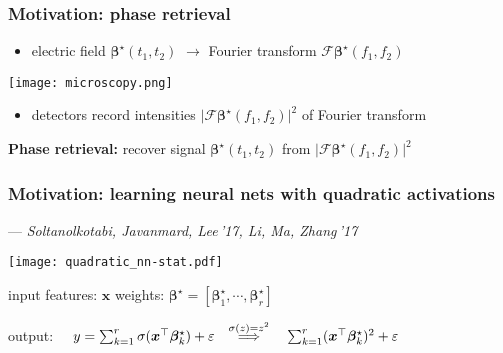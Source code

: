 \documentclass[compress,
mathserif,wide,%
]{beamer}
\begin{document}
\begin{frame}
  \frametitle{Motivation: phase retrieval}



  \begin{itemize}
	\item electric field $\bm{\beta}^\star(t_1, t_2)$  $\longrightarrow$ Fourier transform $\mathcal{F}\bm{\beta}^\star(f_1, f_2)$
  \end{itemize}
  \vfill
\begin{center}
\texttt{[image: microscopy.png]} 
\end{center}

\begin{itemize}
	\item detectors record \alert{intensities} $\big| \mathcal{F}\bm{\beta}^\star(f_1, f_2) \big|^2 $ of Fourier transform
  \end{itemize}
  

\pause


\vfill
{

\begin{varblock}[\textwidth]{}
\begin{center}
   {\bf Phase retrieval:}  recover signal $\bm{\beta}^{\star}(t_{1},t_{2})$ from $| \mathcal{F}\bm{\beta}^\star(f_1, f_2) \big|^2$
\end{center}
\end{varblock}
}
\end{frame}




\begin{frame}
	\frametitle{Motivation: learning neural nets with quadratic activations}

	\hfill --- {\footnotesize \em Soltanolkotabi, Javanmard, Lee\,'17,  Li, Ma, Zhang\,'17}

\begin{center}
\texttt{[image: quadratic\_nn-stat.pdf]}
\end{center}

\vspace{-0.5em}
input features: $\bm{x}$ \quad weights: $\bm{\beta}^{\star}=[\bm{\beta}_1^{\star},\cdots,\bm{\beta}_r^{\star}]$

\vspace{0.3em}
output: $\quad	y  = \sum_{k=1}^r \sigma(\bm{x}^{\top}\bm{\beta}_k^{\star})  + \varepsilon {\quad \stackrel{\sigma(z)=z^2}{\Longrightarrow} \quad \sum_{k=1}^r ({\bm x}^{\top}\bm{\beta}_k^{\star})^2 + \varepsilon}$




\end{frame}
\end{document}
